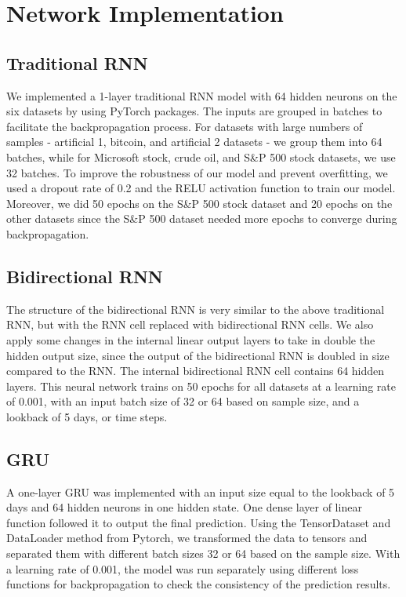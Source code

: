 \documentclass[letterpaper, 10 pt, conference]{ieeeconf}  %
\begin{document}
\section{Network Implementation}
    \subsection{Traditional RNN}
        We implemented a 1-layer traditional RNN model with 64 hidden neurons on the six datasets by using PyTorch packages. The inputs are grouped in batches to facilitate the backpropagation process. For datasets with large numbers of samples - artificial 1, bitcoin, and artificial 2 datasets - we group them into 64 batches, while for Microsoft stock, crude oil, and S\&P 500 stock datasets, we use 32 batches. To improve the robustness of our model and prevent overfitting, we used a dropout rate of 0.2 and the RELU activation function to train our model. Moreover, we did 50 epochs on the S\&P 500 stock dataset and 20 epochs on the other datasets since the S\&P 500 dataset needed more epochs to converge during backpropagation. 

    \subsection{Bidirectional RNN}
        The structure of the bidirectional RNN is very similar to the above traditional RNN, but with the RNN cell replaced with bidirectional RNN cells. We also apply some changes in the internal linear output layers to take in double the hidden output size, since the output of the bidirectional RNN is doubled in size compared to the RNN. The internal bidirectional RNN cell contains 64 hidden layers. This neural network trains on 50 epochs for all datasets at a learning rate of 0.001, with an input batch size of 32 or 64 based on sample size, and a lookback of 5 days, or time steps. 

    \subsection{GRU}
        A one-layer GRU was implemented with an input size equal to the lookback of 5 days and 64 hidden neurons in one hidden state. One dense layer of linear function followed it to output the final prediction. Using the TensorDataset and DataLoader method from Pytorch, we transformed the data to tensors and separated them with different batch sizes 32 or 64 based on the sample size. With a learning rate of 0.001, the model was run separately using different loss functions for backpropagation to check the consistency of the prediction results.
\end{document}

